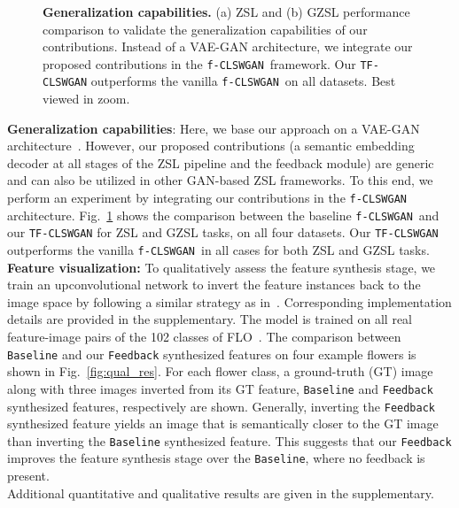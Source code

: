 \documentclass[runningheads]{llncs}
\newcommand{\clswgan}{\texttt{f-CLSWGAN}}
\begin{document}
\begin{figure}[t]
\begin{minipage}{0.5\textwidth}
    \centering
\end{minipage}\begin{minipage}{0.5\textwidth}
    \centering
\end{minipage}\caption{\label{generalization_overall} \textbf{Generalization capabilities.} (a) ZSL and (b) GZSL performance comparison to validate the generalization capabilities of our contributions. Instead of a VAE-GAN architecture, we integrate our proposed contributions in the \clswgan~framework. Our \texttt{TF-CLSWGAN} outperforms the vanilla \clswgan~on all datasets. Best viewed in zoom.}\end{figure}\noindent\textbf{Generalization capabilities}: Here, we base our approach on a VAE-GAN architecture~\cite{Xian19cvpr}. However, our proposed contributions (a semantic embedding decoder at all stages of the ZSL pipeline and the feedback module) are generic and can also be utilized in other GAN-based ZSL frameworks. To this end, we perform an experiment by integrating our contributions in the \clswgan~\cite{Xian18cvpr} architecture. Fig.~\ref{generalization_overall} shows the comparison between the baseline \clswgan~and our \texttt{TF-CLSWGAN} for ZSL and GZSL tasks, on all four datasets. Our \texttt{TF-CLSWGAN} outperforms the vanilla \clswgan~in all cases for both ZSL and GZSL tasks. \\
\noindent\textbf{Feature visualization:} To qualitatively assess the feature synthesis stage, we train an upconvolutional network to invert the feature instances back to the image space by following a similar strategy as in~\cite{dosovitskiy2016generating,Xian19cvpr}. 
Corresponding implementation details are provided in the supplementary. The model is trained on all real feature-image pairs of the 102 classes of FLO~\cite{flo}. The comparison between \texttt{Baseline} and our \texttt{Feedback} synthesized features on four example flowers is shown in Fig.~\ref{fig:qual_res}. For each flower class, a ground-truth (GT) image along with three images inverted from its GT feature, \texttt{Baseline} and \texttt{Feedback} synthesized features, respectively are shown. Generally, inverting the \texttt{Feedback} synthesized feature yields an image that is semantically closer to the GT image than inverting the \texttt{Baseline} synthesized feature. This suggests that our \texttt{Feedback} improves the feature synthesis stage over the \texttt{Baseline}, where no feedback is present. \\ 
Additional quantitative and qualitative results are given in the supplementary.
\end{document}
